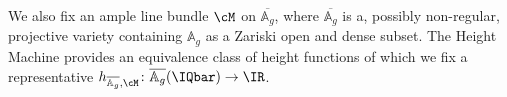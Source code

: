 
We also fix an ample line bundle $\cM$ on $\overline{\mathbb{A}_g}$,
where  $\overline{\mathbb{A}_g}$ is a, possibly non-regular,
projective  variety containing $\mathbb{A}_g$ as a Zariski open and
dense subset. The Height Machine
provides an equivalence class of height functions of which we fix a
representative $h_{\overline{\mathbb{A}_g},\cM} \colon
\overline{\mathbb{A}_g}(\IQbar)\rightarrow \IR$.





